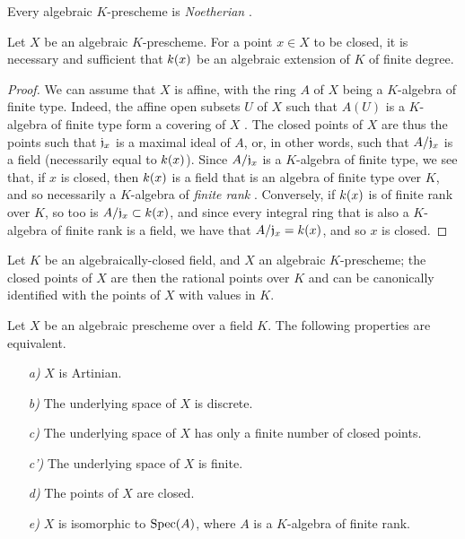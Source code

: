 Every algebraic $K$-prescheme is \emph{Noetherian} .

\begin{prop}[6.4.2]
\label{1.6.4.2}
Let $X$ be an algebraic $K$-prescheme.
For a point $x\in X$ to be closed, it is necessary and sufficient that $k(x)$ be an algebraic extension of $K$ of finite degree.
\end{prop}

\begin{proof}
\label{proof-1.6.4.2}
We can assume that $X$ is affine, with the ring $A$ of $X$ being a $K$-algebra of finite type.
Indeed, the affine open subsets $U$ of $X$ such that $A(U)$ is a $K$-algebra of finite type form a covering of $X$ .
The closed points of $X$ are thus the points such that $\mathfrak{j}_x$ is a maximal ideal of $A$, or, in other words, such that $A/\mathfrak{j}_x$ is a field (necessarily equal to $k(x)$).
Since $A/\mathfrak{j}_x$ is a $K$-algebra of finite type, we see that, if $x$ is closed, then $k(x)$ is a field that is an algebra of finite type over $K$, and so necessarily a $K$-algebra of \emph{finite rank} \cite{I-21}.
Conversely, if $k(x)$ is of finite rank over $K$, so too is $A/\mathfrak{j}_x\subset k(x)$, and since every integral ring that is also a $K$-algebra of finite rank is a field, we have that $A/\mathfrak{j}_x=k(x)$, and so $x$ is closed.
\end{proof}

\begin{cor}[6.4.3]
\label{1.6.4.3}
Let $K$ be an algebraically-closed field, and $X$ an algebraic $K$-prescheme;
the closed points of $X$ are then the rational points over $K$  and can be canonically identified with the points of $X$ with values in $K$.
\end{cor}

\begin{prop}[6.4.4]
\label{1.6.4.4}
Let $X$ be an algebraic prescheme over a field $K$.
The following properties are equivalent.
\begin{itemize}
    \item[\emph{a)}] $X$ is Artinian.
    \item[\emph{b)}] The underlying space of $X$ is discrete.
    \item[\emph{c)}] The underlying space of $X$ has only a finite number of closed points.
    \item[\emph{c')}] The underlying space of $X$ is finite.
    \item[\emph{d)}] The points of $X$ are closed.
    \item[\emph{e)}] $X$ is isomorphic to ${\mathop{\mathrm{Spec}}\nolimits}(A)$, where $A$ is a $K$-algebra of finite rank.
\end{itemize}
\end{prop}

